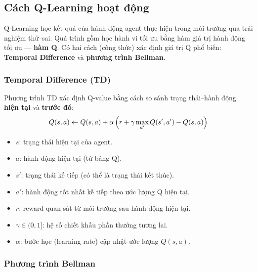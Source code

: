 \subsection{Cách Q-Learning hoạt động}

\begin{phuongphap}[title={Học qua thử--sai}]
Q-Learning học kết quả của hành động agent thực hiện trong môi trường qua trải nghiệm thử--sai.
Quá trình gồm học hành vi tối ưu bằng hàm giá trị hành động tối ưu --- \textbf{hàm Q}.
Có hai cách (công thức) xác định giá trị Q phổ biến: \textbf{Temporal Difference} và \textbf{phương trình Bellman}.
\end{phuongphap}

\subsubsection{Temporal Difference (TD)}

\begin{phuongphap}[title={Cập nhật Temporal Difference}]
Phương trình TD xác định Q-value bằng cách so sánh trạng thái--hành động \textbf{hiện tại} và \textbf{trước đó}:
\[
Q(s,a) \leftarrow Q(s,a) + \alpha\,\Bigl(r + \gamma \max_{a'} Q(s',a') - Q(s,a)\Bigr)
\]
\begin{itemize}
  \item $s$: trạng thái hiện tại của agent.
  \item $a$: hành động hiện tại (từ bảng Q).
  \item $s'$: trạng thái kế tiếp (có thể là trạng thái kết thúc).
  \item $a'$: hành động tốt nhất kế tiếp theo ước lượng Q hiện tại.
  \item $r$: reward quan sát từ môi trường sau hành động hiện tại.
  \item $\gamma \in (0,1]$: hệ số chiết khấu phần thưởng tương lai.
  \item $\alpha$: bước học (learning rate) cập nhật ước lượng $Q(s,a)$.
\end{itemize}
\end{phuongphap}

\subsubsection{Phương trình Bellman}

